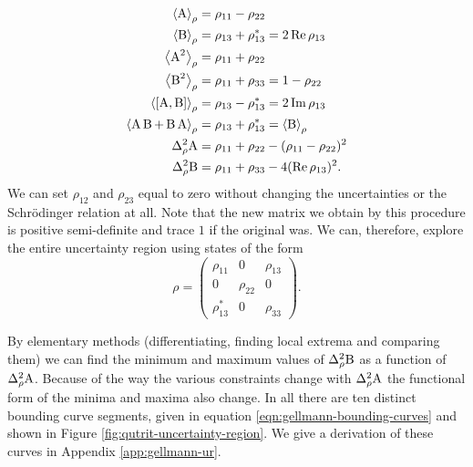 \begin{align}
  \expr{\opa} &= \rho_{11} - \rho_{22}\\
  \expr{\opb} &= \rho_{13} + \rho_{13}^* = 2\operatorname{Re}{\rho_{13} }\\
  \expr{\opa^2} &= \rho_{11} + \rho_{22}\\
  \expr{\opb^2} &= \rho_{11} + \rho_{33} = 1 - \rho_{22}\\
  \expr{\com{\opa}{\opb}} &= \rho_{13} - \rho_{13}^* = 2\operatorname{Im}{\rho_{13} }\\
  \expr{\acom{\opa}{\opb}} &= \rho_{13} + \rho_{13}^* = \expr{\opb}\\
  \varr{\opa} &= \rho_{11} + \rho_{22} - (\rho_{11} - \rho_{22})^2\\
  \varr{\opb} &= \rho_{11} + \rho_{33} - 4(\operatorname{Re}{\rho_{13}})^2.
\end{align}
We can set $\rho_{12}$ and $\rho_{23}$ equal to zero without changing the uncertainties or the Schr\"odinger relation at all. Note that the new matrix we obtain by this procedure is positive semi-definite and trace $1$ if the original was. We can, therefore, explore the entire uncertainty region using states of the form
\begin{equation} \label{eq:qutrit-specialised}
  \rho = \begin{pmatrix}
    \rho_{11} & 0 & \rho_{13}\\
    0 & \rho_{22} & 0\\
    \rho_{13}^* & 0 & \rho_{33}
  \end{pmatrix}.
\end{equation}

By elementary methods (differentiating, finding local extrema and comparing them) we can find the minimum and maximum values of $\varr{\opb}$ as a function of $\varr{\opa}$. Because of the way the various constraints change with $\varr{\opa}$ the functional form of the minima and maxima also change. In all there are ten distinct bounding curve segments, given in equation \eqref{eqn:gellmann-bounding-curves} and shown in Figure \ref{fig:qutrit-uncertainty-region}. We give a derivation of these curves in Appendix \ref{app:gellmann-ur}.

